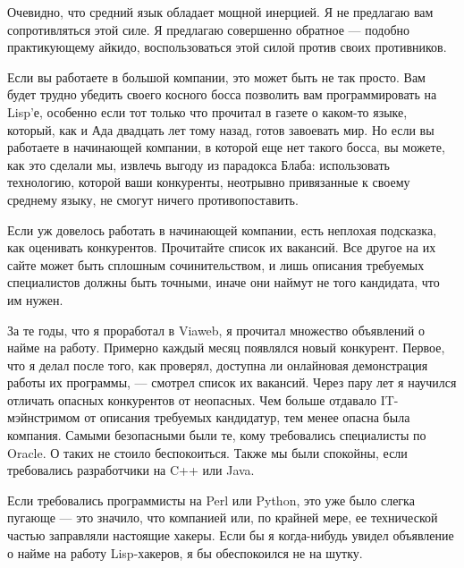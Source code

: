 \documentclass[ebook,12pt,oneside,openany]{memoir}
\begin{document}
Очевидно, что средний язык обладает мощной инерцией. Я не предлагаю
вам сопротивляться этой силе. Я предлагаю совершенно обратное —
подобно практикующему айкидо, воспользоваться этой силой против своих
противников.

Если вы работаете в большой компании, это может быть не так просто.
Вам будет трудно убедить своего косного босса позволить вам
программировать на Lisp'е, особенно если тот только что прочитал в
газете о каком-то языке, который, как и Ада двадцать лет тому назад,
готов завоевать мир. Но если вы работаете в начинающей компании, в
которой еще нет такого босса, вы можете, как это сделали мы, извлечь
выгоду из парадокса Блаба: использовать технологию, которой ваши
конкуренты, неотрывно привязанные к своему среднему языку, не смогут
ничего противопоставить.

Если уж довелось работать в начинающей компании, есть неплохая
подсказка, как оценивать конкурентов. Прочитайте список их вакансий.
Все другое на их сайте может быть сплошным сочинительством, и лишь
описания требуемых специалистов должны быть точными, иначе они наймут
не того кандидата, что им нужен.

За те годы, что я проработал в Viaweb, я прочитал множество объявлений
о найме на работу. Примерно каждый месяц появлялся новый конкурент.
Первое, что я делал после того, как проверял, доступна ли онлайновая
демонстрация работы их программы, — смотрел список их вакансий. Через
пару лет я научился отличать опасных конкурентов от неопасных. Чем
больше отдавало IT-мэйнстримом от описания требуемых кандидатур, тем
менее опасна была компания. Самыми безопасными были те, кому
требовались специалисты по Oracle. О таких не стоило беспокоиться.
Также мы были спокойны, если требовались разработчики на C++ или Java.

Если требовались программисты на Perl или Python, это уже было слегка
пугающе — это значило, что компанией или, по крайней мере, ее
технической частью заправляли настоящие хакеры. Если бы я когда-нибудь
увидел объявление о найме на работу Lisp-хакеров, я бы обеспокоился не
на шутку.
\end{document}
